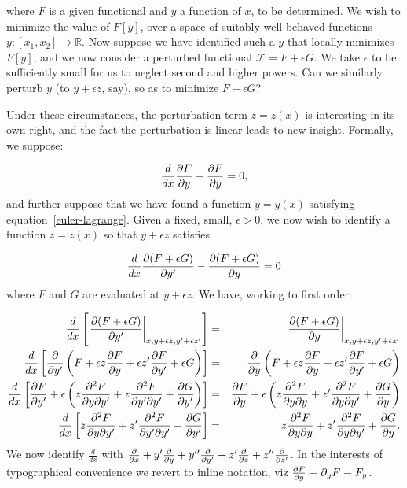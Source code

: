 \documentclass[pdflatex,sn-mathphys-num]{sn-jnl}%
\theoremstyle{thmstyleone}%
\theoremstyle{thmstyletwo}%
\theoremstyle{thmstylethree}%
\begin{document}
\noindent where $F$ is a given functional and $y$ a function of $x$,
to be determined.  We wish to minimize the value of $F[y]$, over a
space of suitably well-behaved functions
$y\colon\left[x_1,x_2\right]\longrightarrow\mathbb{R}$.  Now suppose
we have identified such a $y$ that locally minimizes $F[y]$, and we
now consider a perturbed functional $\mathcal{F}=F+\epsilon G$.  We
take $\epsilon$ to be sufficiently small for us to neglect second and
higher powers.  Can we similarly perturb $y$ (to $y+\epsilon z$, say),
so as to minimize $F+\epsilon G$?

Under these circumstances, the perturbation term $z=z(x)$ is
interesting in its own right, and the fact the perturbation is linear
leads to new insight.  Formally, we suppose:

\begin{equation}\label{euler-lagrange}
  \frac{d}{dx}\frac{\partial{F}}{\partial{y}}-\frac{\partial{F}}{\partial{y}} = 0,
\end{equation}
%
and further suppose that we have found a function $y=y(x)$ satisfying
equation~\ref{euler-lagrange}.  Given a fixed, small, $\epsilon>0$, we
now wish to identify a function $z=z(x)$ so that $y+\epsilon z$
satisfies

\begin{equation}
  \frac{d}{dx}\frac{\partial{(F+\epsilon G)}}{\partial{y'}}-\frac{\partial{(F+\epsilon G)}}{\partial{y}} = 0
\end{equation}
%
where $F$ and $G$ are evaluated at $y+\epsilon z$.  We have, working
to first order:

\begin{eqnarray}
\frac{d}{dx}\left[\left.\frac{\partial{(F+\epsilon G)}}{\partial{y'}}\right|_{x,y+\epsilon z,y'+\epsilon z'}\right]
&=& \left.\frac{\partial{(F+\epsilon G)}}{\partial{y}}\right|_{x,y+\epsilon z,y'+\epsilon z'}\nonumber\\
\frac{d}{dx}\left[\frac{\partial{}}{\partial{y'}}\left(F + \epsilon z\frac{\partial{F}}{\partial{y}} + \epsilon z'\frac{\partial{F}}{\partial{y'}}+\epsilon G\right)\right]
&=& \frac{\partial{}}{\partial{y}}\left(F + \epsilon z\frac{\partial{F}}{\partial{y}} + \epsilon z'\frac{\partial{F}}{\partial{y'}}+\epsilon G\right)\nonumber\\
\frac{d}{dx}\left[\frac{\partial{F}}{\partial{y'}} + \epsilon\left(z\frac{\partial^2{F}}{\partial{y}\partial{y'}} + z\frac{\partial^2{F}}{\partial{y'}\partial{y'}} + \frac{\partial{G}}{\partial{y'}}\right)\right]
&=& \frac{\partial{F}}{\partial{y}} + \epsilon\left(z\frac{\partial^2{F}}{\partial{y}\partial{y}} + z'\frac{\partial^2{F}}{\partial{y}\partial{y'}} + \frac{\partial{G}}{\partial{y}}\right)\nonumber\\
\frac{d}{dx}\left[z\frac{\partial^2{F}}{\partial{y}\partial{y'}} + z'\frac{\partial^2{F}}{\partial{y'}\partial{y'}} + \frac{\partial{G}}{\partial{y'}}\right]
&=& z\frac{\partial^2{F}}{\partial{y}\partial{y}} + z'\frac{\partial^2{F}}{\partial{y}\partial{y'}} + \frac{\partial{G}}{\partial{y}}.
\end{eqnarray}
%
We now identify $\frac{d}{dx}$ with $\frac{\partial{}}{\partial{x}} + y'\frac{\partial{}}{\partial{y}} +
y''\frac{\partial{}}{\partial{y'}} + z'\frac{\partial{}}{\partial{z}} + z''\frac{\partial{}}{\partial{z'}}$.  In the interests of
typographical convenience we revert to inline notation, viz
$\frac{\partial{F}}{\partial{y}}\equiv\partial_yF\equiv F_y$.
\end{document}
